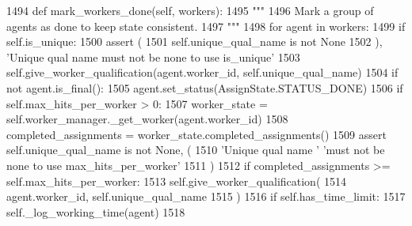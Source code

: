 \begin{DoxyCode}
1494     \textcolor{keyword}{def }mark\_workers\_done(self, workers):
1495         \textcolor{stringliteral}{"""}
1496 \textcolor{stringliteral}{        Mark a group of agents as done to keep state consistent.}
1497 \textcolor{stringliteral}{        """}
1498         \textcolor{keywordflow}{for} agent \textcolor{keywordflow}{in} workers:
1499             \textcolor{keywordflow}{if} self.is\_unique:
1500                 \textcolor{keyword}{assert} (
1501                     self.unique\_qual\_name \textcolor{keywordflow}{is} \textcolor{keywordflow}{not} \textcolor{keywordtype}{None}
1502                 ), \textcolor{stringliteral}{'Unique qual name must not be none to use is\_unique'}
1503                 self.give\_worker\_qualification(agent.worker\_id, self.unique\_qual\_name)
1504             \textcolor{keywordflow}{if} \textcolor{keywordflow}{not} agent.is\_final():
1505                 agent.set\_status(AssignState.STATUS\_DONE)
1506             \textcolor{keywordflow}{if} self.max\_hits\_per\_worker > 0:
1507                 worker\_state = self.worker\_manager.\_get\_worker(agent.worker\_id)
1508                 completed\_assignments = worker\_state.completed\_assignments()
1509                 \textcolor{keyword}{assert} self.unique\_qual\_name \textcolor{keywordflow}{is} \textcolor{keywordflow}{not} \textcolor{keywordtype}{None}, (
1510                     \textcolor{stringliteral}{'Unique qual name '} \textcolor{stringliteral}{'must not be none to use max\_hits\_per\_worker'}
1511                 )
1512                 \textcolor{keywordflow}{if} completed\_assignments >= self.max\_hits\_per\_worker:
1513                     self.give\_worker\_qualification(
1514                         agent.worker\_id, self.unique\_qual\_name
1515                     )
1516             \textcolor{keywordflow}{if} self.has\_time\_limit:
1517                 self.\_log\_working\_time(agent)
1518 
\end{DoxyCode}
\mbox{\label{classparlai_1_1mturk_1_1core_1_1legacy__2018_1_1mturk__manager_1_1MTurkManager_afeb26b61e7d22c89df8c61e246e78532}} 
